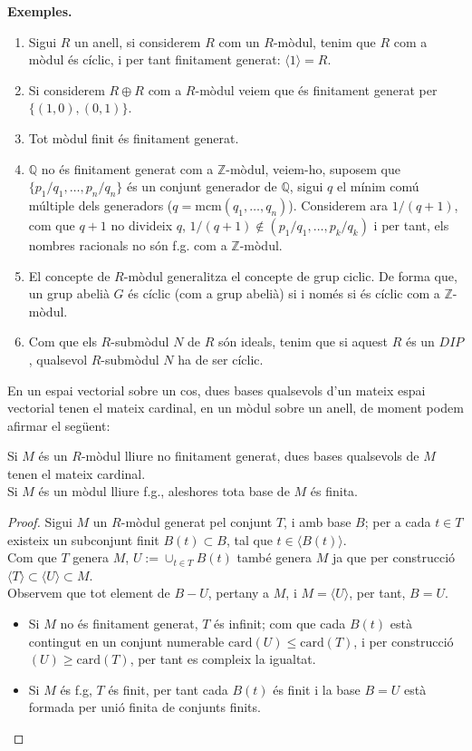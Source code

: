 \textbf{Exemples. } 
\begin{enumerate}[(1)]
\item Sigui $R$ un anell, si considerem $R$ com un $R$-mòdul, tenim que $R$ com a mòdul és cíclic, i per tant finitament generat: $\langle 1 \rangle = R$.
\item Si considerem $R \oplus R$ com a $R$-mòdul veiem que és finitament generat per $\{(1,0),(0,1)\}$.
\item Tot mòdul finit és finitament generat.
\item $\mathbb{Q}$ no és finitament generat com a $\mathbb{Z}$-mòdul, veiem-ho, suposem que $\{p_1/q_1,\dots, p_n/q_n\}$ és un conjunt generador de $\mathbb{Q}$, sigui $q$ el mínim comú múltiple dels generadors ($q=\text{mcm}(q_1,\dots, q_n)$). Considerem ara $1/(q+1)$, com que $q+1$ no divideix $q$, $1/(q+1)\not \in (p_1/q_1,\dots, p_k/q_k)$ i per tant, els nombres racionals no són f.g. com a $\mathbb{Z}$-mòdul.
\item El concepte de $R$-mòdul generalitza el concepte de grup ciclic. De forma que, un grup abelià $G$ és cíclic (com a grup abelià) si i només si és cíclic com a $\mathbb{Z}$-mòdul.
\item Com que els $R$-submòdul $N$ de $R$ són ideals, tenim que si aquest $R$ és un $DIP$, qualsevol $R$-submòdul $N$ ha de ser cíclic.
\end{enumerate}

En un espai vectorial sobre un cos, dues bases qualsevols d'un mateix espai vectorial tenen el mateix cardinal, en un mòdul sobre un anell, de moment podem afirmar el següent:

\begin{prop} \label{prop2} Si $M$ és un $R$-mòdul lliure no finitament generat, dues bases qualsevols de $M$ tenen el mateix cardinal. 
\\
Si $M$ és un mòdul lliure f.g., aleshores tota base de $M$ és finita. 
\end{prop}

\begin{proof} Sigui $M$ un $R$-mòdul generat pel conjunt $T$, i amb base $B$; per a cada $t\in T$ existeix un subconjunt finit $B(t)\subset B$, tal que $t\in \langle B(t) \rangle $. \\
Com que $T$ genera $M$, $U:=\cup_{t\in T}B(t)$ també genera $M$ ja que per construcció $\langle T \rangle \subset \langle U \rangle \subset M$. \\
Observem que tot element de $B-U$, pertany a $M$, i $M=\langle U  \rangle$, per tant, $B=U$.
\begin{itemize}
\item Si $M$ no és finitament generat, $T$ és infinit; com que cada $B(t)$ està contingut en un conjunt numerable $\text{card}(U)\leq \text{card} (T)$, i per construcció $(U)\geq \text{card} (T)$, per tant es compleix la igualtat.
\item Si $M$ és f.g, $T$ és finit, per tant cada $B(t)$ és finit i la base $B=U$ està formada per unió finita de conjunts finits.
\end{itemize}
\end{proof}
  

